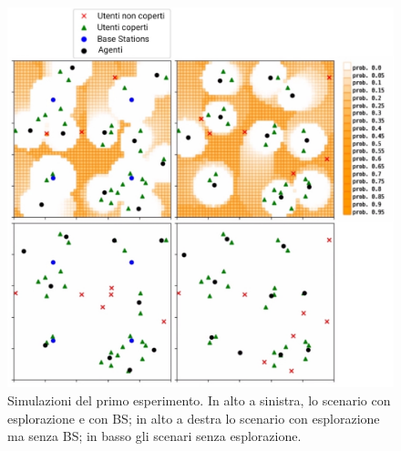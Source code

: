 \begin{figure}[p]
    \centering
    \includegraphics[width=1\linewidth]{img/ch4/experiment1/esempio_simulazioni.jpg}
    \caption[Simulazioni del primo esperimento]{Simulazioni del primo esperimento. In alto a sinistra, lo scenario con esplorazione e con BS; in alto a destra lo scenario con esplorazione ma senza BS; in basso gli scenari senza esplorazione.}
    \label{fig:esempio_simu_exp1}
\end{figure}

